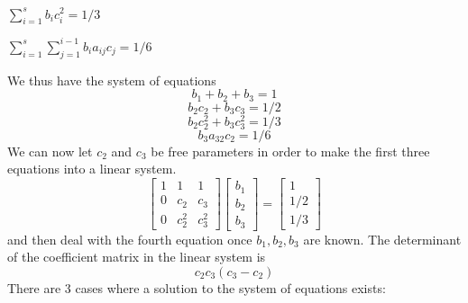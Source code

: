 \documentclass[12pt]{amsart}
\theoremstyle{definition}
\begin{document}
\begin{multicols}{2}
\begin{center}
$\sum_{i = 1}^s{b_ic_i^2} = 1/3$
\end{center}

\begin{center}
$\sum_{i = 1}^s{\sum_{j = 1}^{i - 1}{b_ia_{ij}c_j}} = 1/6$
\end{center}
\end{multicols}
\noindent We thus have the system of equations
$$b_1 + b_2 + b_3 = 1$$
$$b_2c_2 + b_3c_3 = 1/2$$
$$b_2c_2^2 + b_3c_3^2 = 1/3$$
$$b_3a_{32}c_2 = 1/6$$
We can now let $c_2$ and $c_3$ be free parameters
in order to make the first three equations into a linear system.
$$\left[ \begin{matrix}
1 & 1 & 1 \\
0 & c_2 & c_3 \\
0 & c_2^2 & c_3^2
\end{matrix} \right] 
\left[ \begin{matrix} 
b_1 \\ b_2 \\ b_3
\end{matrix} \right] = 
\left[ \begin{matrix} 
1 \\ 1/2 \\ 1/3
\end{matrix} \right]$$
and then deal with the fourth equation once $b_1, b_2, b_3$ are known.
The determinant of the coefficient matrix in the linear system is 
$$c_2c_3(c_3 - c_2)$$
There are 3 cases where a solution to the system of equations exists:
\end{document}
